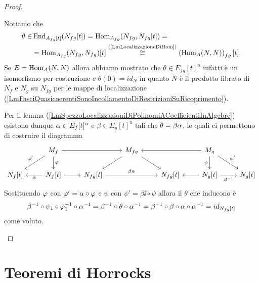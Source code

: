 \begin{proof}
\begin{itemize}
Notiamo che 
\begin{align*}
	\theta\in& \operatorname{End}_{A_{fg}[t]}(N_{fg}[t])=\operatorname{Hom}_{A_{fg}}(N_{fg},N_{fg}[t])=\\
	&=\operatorname{Hom}_{A_{fg}}(N_{fg},N_{fg})[t]\overset{\text{(\ref{LmLocalizzazioneDiHom})}}{\cong}\left({\operatorname{Hom}_A(N,N)}\right)_{fg}[t].
\end{align*}
Se $E=\operatorname{Hom}_A(N,N)$ allora abbiamo mostrato che $\theta\in E_{fg}[t]^u$ infatti \`e un isomorfismo per costruzione e $\theta(0)=id_N$ in quanto $N$ \`e il prodotto fibrato di $N_f$ e $N_g$ su $N_{fg}$ per le mappe di localizzazione (\ref{LmFasciQuasicoerentiSonoIncollamentoDiRestrizioniSuRicoprimento}).

Per il lemma (\ref{LmSpezzoLocalizzazioniDiPolinomiACoefficientiInAlgebre}) esistono dunque $\alpha\in E_f[t]^u$ e $\beta\in E_g[t]^u$ tali che $\theta=\beta\alpha$, le quali ci permettono di costruire il diagramma
\[\begin{tikzcd}
	& {M_f} && {M_{fg}} && {M_g} \\
	{N_f[t]} & {N_f[t]} & {N_{fg}[t]} && {N_{fg}[t]} & {N_g[t]} & {N_g[t]}
	\arrow[from=1-2, to=1-4]
	\arrow["{\varphi'}"', from=1-2, to=2-1]
	\arrow["\varphi", from=1-2, to=2-2]
	\arrow[from=1-4, to=2-3]
	\arrow[from=1-4, to=2-5]
	\arrow[from=1-6, to=1-4]
	\arrow["\psi"', from=1-6, to=2-6]
	\arrow["{\psi'}", from=1-6, to=2-7]
	\arrow["\alpha", from=2-2, to=2-1]
	\arrow[from=2-2, to=2-3]
	\arrow["{\beta\alpha}", from=2-3, to=2-5]
	\arrow[from=2-6, to=2-5]
	\arrow["{\beta^{-1}}"', from=2-6, to=2-7]
\end{tikzcd}\]
Sostituendo $\varphi$ con $\varphi'=\alpha\circ \varphi$ e $\psi$ con $\psi'=\beta\ii\circ \psi$ allora il $\theta$ che inducono \`e 
\[\beta^{-1}\circ \psi_1\circ \varphi_1^{-1}\circ \alpha^{-1}=\beta^{-1}\circ\theta\circ \alpha^{-1}=\beta^{-1}\circ\beta\circ\alpha\circ \alpha^{-1}=id_{N_{fg}[t]}\]
come voluto.
\end{itemize}
\setlength{\leftmargini}{0.5cm}
\end{proof}



\section{Teoremi di Horrocks}

